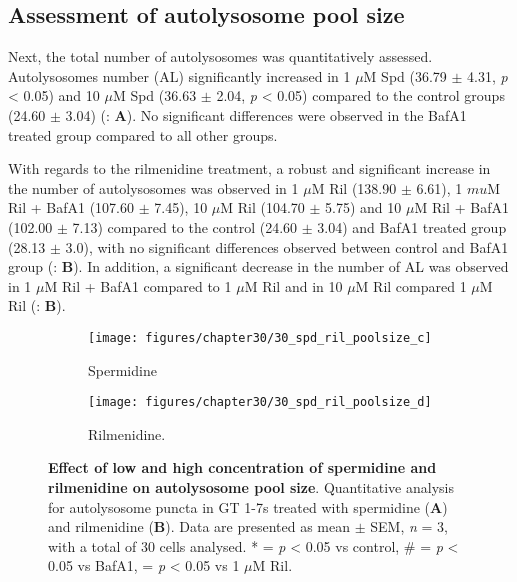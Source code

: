 {\subsection{Assessment of autolysosome pool size}
Next, the total number of autolysosomes was quantitatively assessed.  Autolysosomes number (AL) significantly increased in 1 $\mu$M Spd (36.79 $\pm$ 4.31, \textit{p} < 0.05) and 10 $\mu$M Spd (36.63 $\pm$ 2.04, \textit{p} < 0.05) compared to the control groups (24.60 $\pm$ 3.04) (: \textbf{A}). No significant differences were observed in the BafA1 treated group compared to all other groups.

With regards to the rilmenidine treatment, a robust and significant increase in the number of autolysosomes was observed in 1 $\mu$M Ril (138.90 $\pm$ 6.61), 1 $mu$M Ril + BafA1 (107.60 $\pm$ 7.45), 10 $\mu$M Ril (104.70 $\pm$ 5.75) and 10 $\mu$M Ril + BafA1 (102.00 $\pm$ 7.13) compared to the control (24.60 $\pm$ 3.04) and BafA1 treated group (28.13 $\pm$ 3.0), with no significant differences observed between control and BafA1 group (: \textbf{B}). In addition, a significant decrease in the number of AL was observed in 1 $\mu$M Ril + BafA1 compared to 1 $\mu$M Ril and in 10 $\mu$M Ril compared 1 $\mu$M Ril (: \textbf{B}).

\begin{figure}[!htbp]
  \begin{subfigure}[b]{0.495\linewidth}
    \texttt{[image: figures/chapter30/30\_spd\_ril\_poolsize\_c]}
    \caption{Spermidine}
  \end{subfigure}
  \begin{subfigure}[b]{0.495\linewidth}
    \texttt{[image: figures/chapter30/30\_spd\_ril\_poolsize\_d]}
    \caption{Rilmenidine.}
  \end{subfigure}
  \caption[Effect of a low and high concentration of spermidine and rilmenidine on autolysosome pool size]{\textbf{Effect of low and high concentration of spermidine and rilmenidine on autolysosome pool size}. Quantitative analysis for autolysosome puncta in GT 1-7s treated with spermidine (\textbf{A}) and rilmenidine (\textbf{B}). Data are presented as mean $\pm$ SEM, \textit{n} = 3, with a total of 30 cells analysed. * = \textit{p} < 0.05 vs control, \# = \textit{p} < 0.05 vs BafA1, \@ = \textit{p} < 0.05 vs 1 $\mu$M Ril.}
  \label{fig:30_spd_ril_poolsize2}
\end{figure}

}
